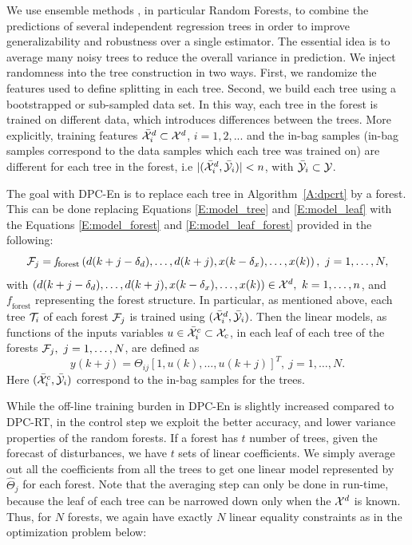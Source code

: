 We use ensemble methods \cite{Friedman2001}, in particular Random Forests, to combine the predictions of several independent regression trees in order to improve generalizability and robustness over a single estimator. 
The essential idea is to average many noisy trees to reduce the overall variance in prediction.
We inject randomness into the tree construction in two ways. First, we randomize the features used to define splitting in each tree.
Second, we build each tree using a bootstrapped or sub-sampled data set.
In this way, each tree in the forest is trained on different data, which introduces differences between the trees.
\textcolor[rgb]{0,0,1}{More explicitly, training features $\bar{\mathcal{X}}^d_i\subset\mathcal{X}^d$, $i=1,2,...$ and the in-bag samples (in-bag samples correspond to the data samples which each tree was trained on) are different for each tree in the forest, i.e $|(\bar {\mathcal{X}}^d_i,\bar{\mathcal{Y}}_i)|<n$, with $\bar{\mathcal{Y}}_i\subset\mathcal{Y}$.}

\textcolor[rgb]{0,0,1}{The goal with DPC-En is to replace each tree in Algorithm~\ref{A:dpcrt} by a forest.
This can be done replacing Equations \eqref{E:model_tree} and \eqref{E:model_leaf} with the Equations \eqref{E:model_forest} and \eqref{E:model_leaf_forest} provided in the following:
\begin{equation}\label{E:model_forest}
\F_j = \mathit{f}_{\mathrm{forest}} \left( d(k+j-\delta_d),\ldots,d(k+j),x(k-\delta_x),\ldots,x(k)  \right),\ j=1,\ldots,N,
\end{equation}
with $\left( d(k+j-\delta_d),\ldots,d(k+j),x(k-\delta_x),\ldots,x(k)  \right)\in\X^d,\ k=1,\ldots,n$, and $\mathit{f}_{\mathrm{forest}}$ representing the forest structure.
In particular, as mentioned above, each tree $\mathcal{T}_i$ of each forest $\mathcal{F}_j$ is trained using $(\bar {\mathcal{X}}^d_i,\bar{\mathcal{Y}}_i)$.
Then the linear models, as functions of the inputs variables $u\in\bar{\mathcal{X}}^c_i\subset\mathcal{X}_c$, in each leaf of each tree of the forests $\F_j,\ j=1,\ldots,N$, are defined as
\begin{equation}\label{E:model_leaf_forest}
y(k+j) =  \Theta_{ij} [1,u(k),\ldots,u(k+j) ]^T,\ j=1,\ldots,N.
\end{equation}
Here $(\bar{\mathcal{X}}^c_i,\bar{\mathcal{Y}}_i)$ correspond to the in-bag samples for the trees.}

While the off-line training burden in DPC-En is slightly increased compared to DPC-RT, in the control step we exploit the better accuracy, and lower variance properties of the random forests. 
If a forest has $t$ number of trees, given the forecast of disturbances, we have $t$ sets of linear coefficients. We simply average out all the coefficients from all the trees to get one linear model represented by $\hat{\Theta}_j$ for each forest. Note that the averaging step can only be done in run-time, because the leaf of each tree can be narrowed down only when the $\mathcal{X}^d$ is known. Thus, for $N$ forests, we again have exactly $N$ linear equality constraints as in the optimization problem below:

